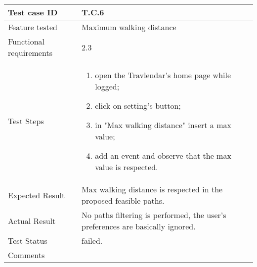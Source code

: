 \begin{table}[H]
	\begin{center}
		\begin{tabular}{ | p{} | p{} | }
		\hline
		Test case ID & T.C.6\\
		\hline
		Feature tested & Maximum walking
distance\\
		\hline
		Functional requirements & 2.3  \\
		\hline
		Test Steps & 
			\begin{enumerate}
				\item open the Travlendar's home page while logged;
				\item click on setting's button;
				\item in "Max walking distance" insert a max value;
				\item add an event and observe that the max value is respected.
			\end{enumerate} \\
		\hline
		Expected Result & Max walking distance is respected in the proposed feasible paths.\\
		\hline
		Actual Result & No paths filtering is performed, the user's preferences are basically ignored.\\ 
		\hline
		Test Status & \color{Red}failed.\\ 
		\hline
		Comments &\\ 
		\hline
		\end{tabular}
	\end{center}
\end{table}

